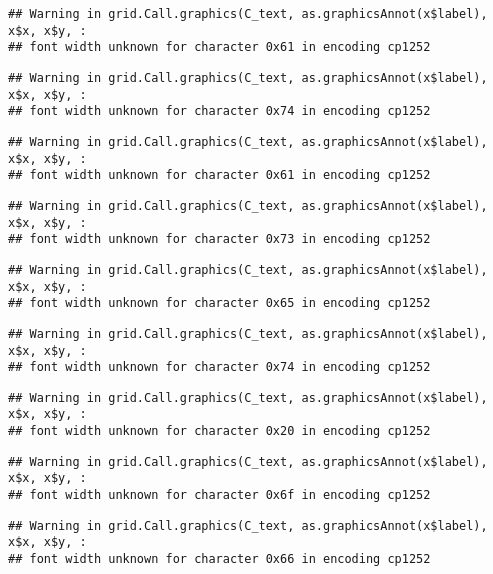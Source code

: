 \documentclass[
]{article}
\begin{document}
\begin{verbatim}
## Warning in grid.Call.graphics(C_text, as.graphicsAnnot(x$label), x$x, x$y, :
## font width unknown for character 0x61 in encoding cp1252
\end{verbatim}

\begin{verbatim}
## Warning in grid.Call.graphics(C_text, as.graphicsAnnot(x$label), x$x, x$y, :
## font width unknown for character 0x74 in encoding cp1252
\end{verbatim}

\begin{verbatim}
## Warning in grid.Call.graphics(C_text, as.graphicsAnnot(x$label), x$x, x$y, :
## font width unknown for character 0x61 in encoding cp1252
\end{verbatim}

\begin{verbatim}
## Warning in grid.Call.graphics(C_text, as.graphicsAnnot(x$label), x$x, x$y, :
## font width unknown for character 0x73 in encoding cp1252
\end{verbatim}

\begin{verbatim}
## Warning in grid.Call.graphics(C_text, as.graphicsAnnot(x$label), x$x, x$y, :
## font width unknown for character 0x65 in encoding cp1252
\end{verbatim}

\begin{verbatim}
## Warning in grid.Call.graphics(C_text, as.graphicsAnnot(x$label), x$x, x$y, :
## font width unknown for character 0x74 in encoding cp1252
\end{verbatim}

\begin{verbatim}
## Warning in grid.Call.graphics(C_text, as.graphicsAnnot(x$label), x$x, x$y, :
## font width unknown for character 0x20 in encoding cp1252
\end{verbatim}

\begin{verbatim}
## Warning in grid.Call.graphics(C_text, as.graphicsAnnot(x$label), x$x, x$y, :
## font width unknown for character 0x6f in encoding cp1252
\end{verbatim}

\begin{verbatim}
## Warning in grid.Call.graphics(C_text, as.graphicsAnnot(x$label), x$x, x$y, :
## font width unknown for character 0x66 in encoding cp1252
\end{verbatim}
\end{document}
